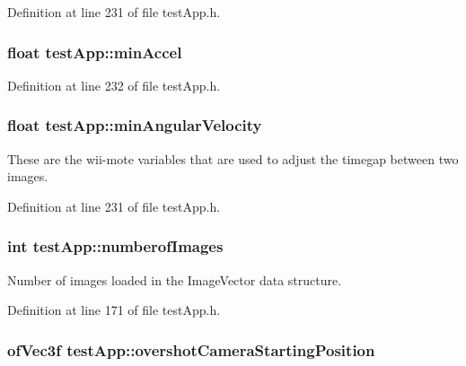 Definition at line 231 of file test\-App.\-h.

\hypertarget{classtest_app_ab007edbc20b09d607f8010e2dbafdb97}{
\subsubsection[{min\-Accel}]{\setlength{\rightskip}{0pt plus 5cm}float test\-App\-::min\-Accel}}\label{classtest_app_ab007edbc20b09d607f8010e2dbafdb97}


Definition at line 232 of file test\-App.\-h.

\hypertarget{classtest_app_ac559756a01e0b98378bc29dfba9fac79}{
\subsubsection[{min\-Angular\-Velocity}]{\setlength{\rightskip}{0pt plus 5cm}float test\-App\-::min\-Angular\-Velocity}}\label{classtest_app_ac559756a01e0b98378bc29dfba9fac79}


These are the wii-\/mote variables that are used to adjust the timegap between two images. 



Definition at line 231 of file test\-App.\-h.

\hypertarget{classtest_app_a957cf7fdb3ea964a88ca1be13e4d68fc}{
\subsubsection[{numberof\-Images}]{\setlength{\rightskip}{0pt plus 5cm}int test\-App\-::numberof\-Images}}\label{classtest_app_a957cf7fdb3ea964a88ca1be13e4d68fc}


Number of images loaded in the Image\-Vector data structure. 



Definition at line 171 of file test\-App.\-h.

\hypertarget{classtest_app_a846feea7c2c4d4b1929bb72c546b3e19}{
\subsubsection[{overshot\-Camera\-Starting\-Position}]{\setlength{\rightskip}{0pt plus 5cm}of\-Vec3f test\-App\-::overshot\-Camera\-Starting\-Position}}\label{classtest_app_a846feea7c2c4d4b1929bb72c546b3e19}



